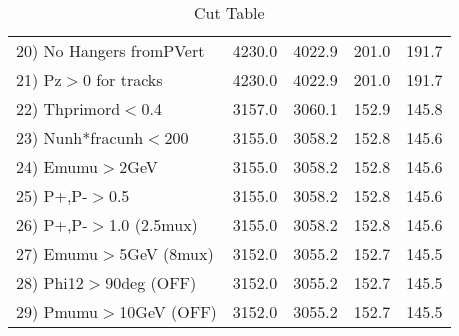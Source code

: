 \begin{table}[h!]
\begin{tabular}{||l||r|r|r|r||}
 20) No Hangers fromPVert &      4230.0 &      4022.9 &       201.0 &       191.7 \\
 21) Pz$>$0 for tracks    &      4230.0 &      4022.9 &       201.0 &       191.7 \\
 22) Thprimord$<$0.4      &      3157.0 &      3060.1 &       152.9 &       145.8 \\
 23) Nunh*fracunh$<$200   &      3155.0 &      3058.2 &       152.8 &       145.6 \\
 24) Emumu$>$2GeV         &      3155.0 &      3058.2 &       152.8 &       145.6 \\
 25) P+,P-$>$0.5          &      3155.0 &      3058.2 &       152.8 &       145.6 \\
 26) P+,P-$>$1.0 (2.5mux) &      3155.0 &      3058.2 &       152.8 &       145.6 \\
 27) Emumu$>$5GeV  (8mux) &      3152.0 &      3055.2 &       152.7 &       145.5 \\
 28) Phi12$>$90deg  (OFF) &      3152.0 &      3055.2 &       152.7 &       145.5 \\
 29) Pmumu$>$10GeV  (OFF) &      3152.0 &      3055.2 &       152.7 &       145.5 \\
 \hline
 \hline
 \end{tabular}
 \caption{Cut Table \cohrp  }
 \label{tab-cut_crhop}
 \end{table}
